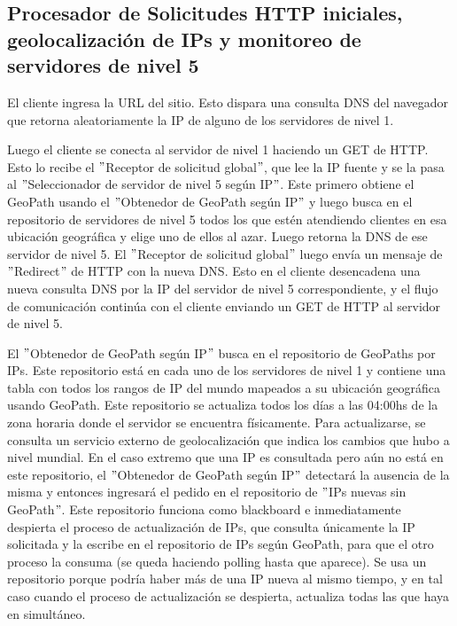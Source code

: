 \subsection{Procesador de Solicitudes HTTP iniciales, geolocalización de IPs y monitoreo de servidores de nivel 5} \label{seccionDNS}


El cliente ingresa la URL del sitio. Esto dispara una consulta DNS del navegador
que retorna aleatoriamente la IP de alguno de los servidores de nivel 1.

Luego el cliente se conecta al servidor de nivel 1 haciendo un GET de HTTP. Esto
lo recibe el $"$Receptor de solicitud global$"$, que lee la IP fuente y se la pasa al
$"$Seleccionador de servidor de nivel 5 según IP$"$. Este primero obtiene el GeoPath
usando el $"$Obtenedor de GeoPath según IP$"$ y luego busca en el repositorio de servidores
de nivel 5 todos los que estén atendiendo clientes en esa ubicación geográfica y elige uno
de ellos al azar. Luego retorna la DNS de ese servidor de nivel 5. El $"$Receptor de solicitud
global$"$ luego envía un mensaje de $"$Redirect$"$ de HTTP con la nueva DNS. Esto en el cliente
desencadena una nueva consulta DNS por la IP del servidor de nivel 5 correspondiente, y el
flujo de comunicación continúa con el cliente enviando un GET de HTTP al servidor de nivel 5.

El $"$Obtenedor de GeoPath según IP$"$ busca en el repositorio de GeoPaths por IPs. Este
repositorio está en cada uno de los servidores de nivel 1 y contiene una tabla con todos los
rangos de IP del mundo mapeados a su ubicación geográfica usando GeoPath. Este repositorio
se actualiza todos los días a las 04:00hs de la zona horaria donde el servidor se encuentra
físicamente. Para actualizarse, se consulta un servicio externo de geolocalización que indica los
cambios que hubo a nivel mundial. En el caso extremo que una IP es consultada pero aún no
está en este repositorio, el $"$Obtenedor de GeoPath según IP$"$ detectará la ausencia de la misma
y entonces ingresará el pedido en el repositorio de $"$IPs nuevas sin GeoPath$"$. Este repositorio
funciona como blackboard e inmediatamente despierta el proceso de actualización de IPs,
que consulta únicamente la IP solicitada y la escribe en el repositorio de IPs según GeoPath, para
que el otro proceso la consuma (se queda haciendo polling hasta que aparece). Se usa un
repositorio porque podría haber más de una IP nueva al mismo tiempo, y en tal caso cuando el proceso
de actualización se despierta, actualiza todas las que haya en simultáneo.

